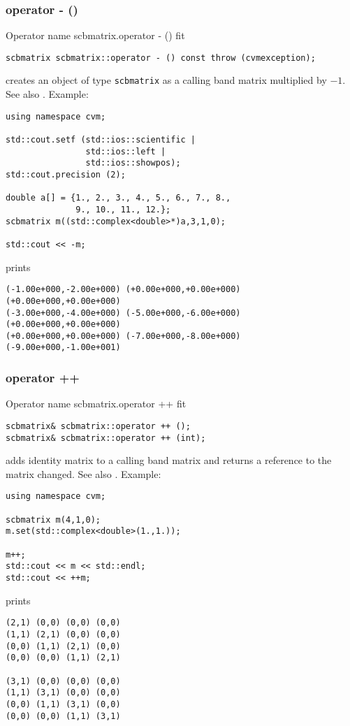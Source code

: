 \subsubsection{operator - ()}
Operator%
\pdfdest name {scbmatrix.operator - ()} fit
\begin{verbatim}
scbmatrix scbmatrix::operator - () const throw (cvmexception);
\end{verbatim}
creates an object of type \verb"scbmatrix" as
a calling band matrix multiplied by $-1$.
See also .
Example:
\begin{Verbatim}
using namespace cvm;

std::cout.setf (std::ios::scientific | 
                std::ios::left | 
                std::ios::showpos); 
std::cout.precision (2);

double a[] = {1., 2., 3., 4., 5., 6., 7., 8.,
              9., 10., 11., 12.};
scbmatrix m((std::complex<double>*)a,3,1,0);

std::cout << -m;
\end{Verbatim}
prints
\begin{Verbatim}
(-1.00e+000,-2.00e+000) (+0.00e+000,+0.00e+000) (+0.00e+000,+0.00e+000)
(-3.00e+000,-4.00e+000) (-5.00e+000,-6.00e+000) (+0.00e+000,+0.00e+000)
(+0.00e+000,+0.00e+000) (-7.00e+000,-8.00e+000) (-9.00e+000,-1.00e+001)
\end{Verbatim}
\newpage



\subsubsection{operator ++}
Operator%
\pdfdest name {scbmatrix.operator ++} fit
\begin{verbatim}
scbmatrix& scbmatrix::operator ++ ();
scbmatrix& scbmatrix::operator ++ (int);
\end{verbatim}
adds identity matrix to a calling band matrix
and returns a reference to
the matrix changed.
See also .
Example:
\begin{Verbatim}
using namespace cvm;

scbmatrix m(4,1,0);
m.set(std::complex<double>(1.,1.));

m++;
std::cout << m << std::endl;
std::cout << ++m;
\end{Verbatim}
prints
\begin{Verbatim}
(2,1) (0,0) (0,0) (0,0)
(1,1) (2,1) (0,0) (0,0)
(0,0) (1,1) (2,1) (0,0)
(0,0) (0,0) (1,1) (2,1)

(3,1) (0,0) (0,0) (0,0)
(1,1) (3,1) (0,0) (0,0)
(0,0) (1,1) (3,1) (0,0)
(0,0) (0,0) (1,1) (3,1)
\end{Verbatim}
\newpage



